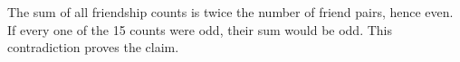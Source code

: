 The sum of all friendship counts is twice the number of friend pairs, hence even. If every one of the 15 counts were odd, their sum would be odd. This contradiction proves the claim.
